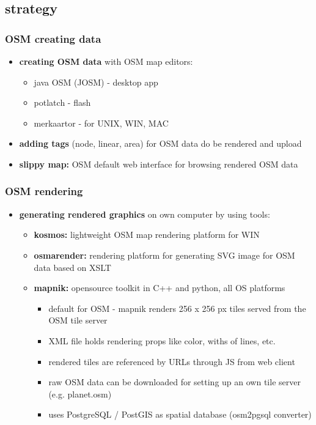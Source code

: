 \documentclass[blue]{beamer}
\begin{document}
\subsection{strategy}
\frame
{
\frametitle{\textbf{OSM creating data}}
\begin{itemize}
	\item \textbf{creating OSM data} with OSM map editors:
	\begin{itemize}
			\item java OSM (JOSM) - desktop app
			\item potlatch - flash
			\item merkaartor - for UNIX, WIN, MAC
	\end{itemize}
	\item \textbf{adding tags} (node, linear, area) for OSM data do be rendered and upload
	\item \textbf{slippy map:} OSM default web interface for browsing rendered OSM data
\end{itemize}
}

\frame
{
\frametitle{\textbf{OSM rendering}}
\begin{itemize}
\item \textbf{generating rendered graphics} on own computer by using tools:
	\begin{itemize}
			\item \textbf{kosmos:} lightweight OSM map rendering platform for WIN
			\item \textbf{osmarender:} rendering platform for generating SVG image for OSM data based on XSLT
			\item \textbf{mapnik:} opensource toolkit in C++ and python, all OS platforms
			\begin{itemize}
				\item default for OSM - mapnik renders 256 x 256 px tiles served from the OSM tile server
				\item XML file holds rendering props like color, withs of lines, etc.
				\item rendered tiles are referenced by URLs through JS from web client
				\item raw OSM data can be downloaded for setting up an own tile server (e.g. planet.osm)
				\item uses PostgreSQL / PostGIS as spatial database (osm2pgsql converter)
		\end{itemize}
	\end{itemize}
\end{itemize}
}
\end{document}
